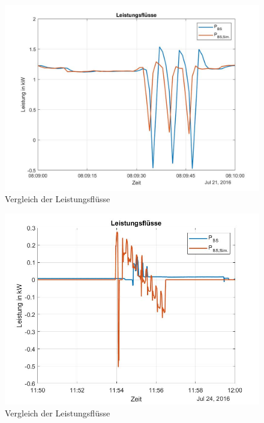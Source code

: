 \begin{figure}[H]
    \centering
    \includegraphics[width=\textwidth]{Abbildungen/8.09.jpg}
    \caption{Vergleich der Leistungsflüsse}
    \label{fig:plot1_230731}
\end{figure}

\begin{figure}[H]
    \centering
    \includegraphics[width=\textwidth]{Abbildungen/11.54.jpg}
    \caption{Vergleich der Leistungsflüsse}
    \label{fig:plot2_230731}
\end{figure}

\newpage

